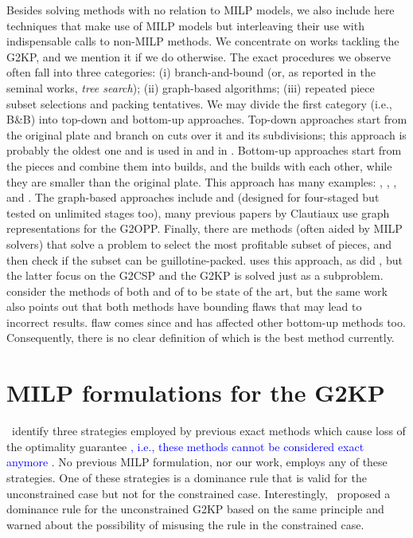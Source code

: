 \documentclass[ppgc,tese,english,formais,babel]{iiufrgs}
\newif\iffinalversion
\newcommand{\newtext}[1]{\iffinalversion%
#1%
\else%
\textcolor{blue}{#1}%
\fi%
}
\begin{document}
Besides solving methods with no relation to MILP models, we also include here techniques that make use of MILP models but interleaving their use with indispensable calls to non-MILP methods.
We concentrate on works tackling the G2KP, and we mention it if we do otherwise.
The exact procedures we observe often fall into three categories: (i) branch-and-bound (or, as reported in the seminal works, \emph{tree search}); (ii) graph-based algorithms; (iii) repeated piece subset selections and packing tentatives.
We may divide the first category (i.e., B\&B) into top-down and bottom-up approaches.
Top-down approaches start from the original plate and branch on cuts over it and its subdivisions; this approach is probably the oldest one and is used in \citet{cw:1977} and in \citet{nicos:1995:ssr}.
Bottom-up approaches start from the pieces and combine them into builds, and the builds with each other, while they are smaller than the original plate. This approach has many examples: \citet{bagchi:1993}, \citet{hifi:1997}, \citet{cung:2000}, and \citet{yoon:2013}.
The graph-based approaches include \citet{morabito:1996} and \citet{clautiaux:2018} (designed for four-staged but tested on unlimited stages too), many previous papers by Clautiaux use graph representations for the G2OPP.
Finally, there are methods (often aided by MILP solvers) that solve a problem to select the most profitable subset of pieces, and then check if the subset can be guillotine-packed.
\citet{dolatabadi:2012} uses this approach, as did \citet{pisinger:2007}, but the latter focus on the G2CSP and the G2KP is solved just as a subproblem.
\citet{russo:2020} consider the methods of both \citet{dolatabadi:2012} and of \citet{yoon:2013} to be state of the art, but the same work also points out that both methods have bounding flaws that may lead to incorrect results.
\citet{yoon:2013} flaw comes since \citet{cung:2000} and has affected other bottom-up methods too.
Consequently, there is no clear definition of which is the best method currently.

\section{MILP formulations for the G2KP}

\citet{russo:2020}~identify three strategies employed by previous exact methods which cause loss of the optimality guarantee\newtext{, i.e., these methods cannot be considered exact anymore}.
No previous MILP formulation, nor our work, employs any of these strategies.
One of these strategies is a dominance rule that is valid for the unconstrained case but not for the constrained case.
Interestingly, \citet{herz:1972}~proposed a dominance rule for the unconstrained G2KP based on the same principle and warned about the possibility of misusing the rule in the constrained case.
\end{document}
